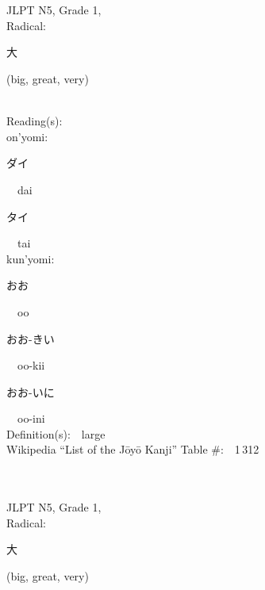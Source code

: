 \begin{multicols}{2}
\ \ \\
{\fontsize{34pt}{40pt}  }\ \ \\  %
{JLPT N5, Grade 1, \\Radical:\ \ {\begin{CJK}{UTF8}{min} 大 \end{CJK}} (big, great, very) } \\
Reading(s):\ \ \\
{\hspace*{1em}}on'yomi:\ \ \\
{\hspace*{2em}}{\begin{CJK}{UTF8}{min} ダイ \end{CJK}}\ \ dai\ \ \\
{\hspace*{2em}}{\begin{CJK}{UTF8}{min} タイ \end{CJK}}\ \ tai\ \ \\
{\hspace*{1em}}kun'yomi:\ \ \\
{\hspace*{2em}}{\begin{CJK}{UTF8}{min} おお \end{CJK}}\ \ oo\ \ \\
{\hspace*{2em}}{\begin{CJK}{UTF8}{min} おお-きい \end{CJK}}\ \ oo-kii\ \ \\
{\hspace*{2em}}{\begin{CJK}{UTF8}{min} おお-いに \end{CJK}}\ \ oo-ini\ \ \\
Definition(s):\ \ large \\
Wikipedia ``List of the J\=oy\=o Kanji'' Table \#:\ \ 1\,312 \\
\ \ \\
{\fontsize{34pt}{40pt}  }\ \ \\  %
{JLPT N5, Grade 1, \\Radical:\ \ {\begin{CJK}{UTF8}{min} 大 \end{CJK}} (big, great, very) } \\

\end{multicols}
